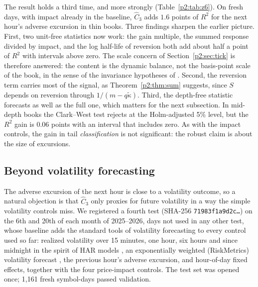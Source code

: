 The result holds a third time, and more strongly (Table~\ref{p2:tab:z6}). On fresh days, with impact already in the baseline, $\hat C_3$ adds $1.6$ points of $R^2$ for the next hour's adverse excursion in thin books. Three findings sharpen the earlier picture. First, two unit-free statistics now work: the gain multiple, the summed response divided by impact, and the log half-life of reversion both add about half a point of $R^2$ with intervals above zero. The scale concern of Section~\ref{p2:sec:tick} is therefore answered: the content is the dynamic balance, not the basis-point scale of the book, in the sense of the invariance hypotheses of \citet{p2:kyle2016}. Second, the reversion term carries most of the signal, as Theorem~\ref{p2:thm:sum} suggests, since $S$ depends on reversion through $1/(m-q\tilde\kappa)$. Third, the depth-free statistic forecasts as well as the full one, which matters for the next subsection. In mid-depth books the Clark--West test rejects at the Holm-adjusted 5\% level, but the $R^2$ gain is $0.06$ points with an interval that includes zero. As with the impact controls, the gain in tail \emph{classification} is not significant: the robust claim is about the size of excursions.

\subsection{Beyond volatility forecasting}\label{p2:sec:z9}
The adverse excursion of the next hour is close to a volatility outcome, so a natural objection is that $\hat C_3$ only proxies for future volatility in a way the simple volatility controls miss. We registered a fourth test (SHA-256 \texttt{71983f1a9d2c\ldots}) on the 6th and 20th of each month of 2025--2026, days not used in any other test, whose baseline adds the standard tools of volatility forecasting to every control used so far: realized volatility over 15 minutes, one hour, six hours and since midnight in the spirit of HAR models \citep{p2:corsi2009}, an exponentially weighted (RiskMetrics) volatility forecast \citep{p2:riskmetrics1996}, the previous hour's adverse excursion, and hour-of-day fixed effects, together with the four price-impact controls. The test set was opened once; 1{,}161 fresh symbol-days passed validation.

